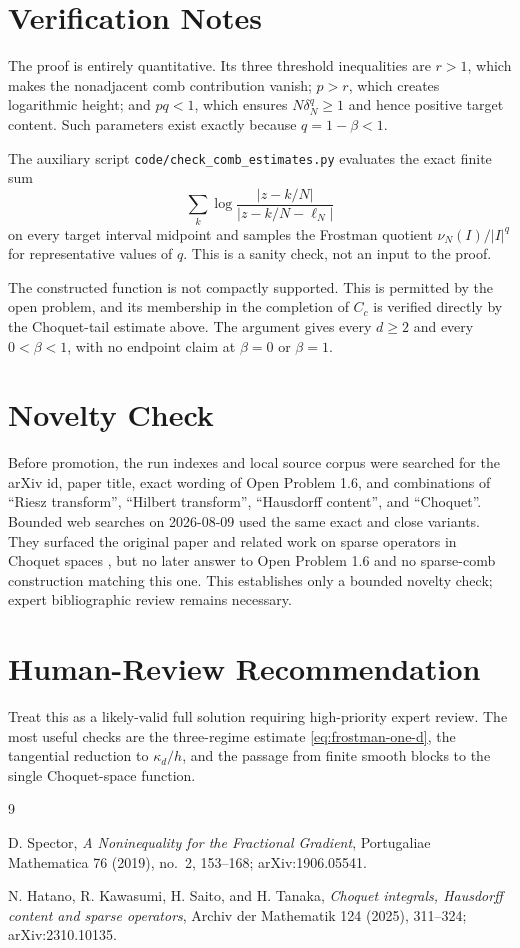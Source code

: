 \documentclass[11pt]{article}
\newcommand{\1}{\mathbf 1}
\begin{document}
\section*{Verification Notes}

The proof is entirely quantitative.  Its three threshold inequalities are
$r>1$, which makes the nonadjacent comb contribution vanish;
$p>r$, which creates logarithmic height; and $pq<1$, which ensures
$N\delta_N^q\geq1$ and hence positive target content.  Such parameters exist
exactly because $q=1-\beta<1$.

The auxiliary script \texttt{code/check\_comb\_estimates.py} evaluates the
exact finite sum
\[
 \sum_k\log\frac{|z-k/N|}{|z-k/N-\ell_N|}
\]
on every target interval midpoint and samples the Frostman quotient
$\nu_N(I)/|I|^q$ for representative values of $q$.  This is a sanity check,
not an input to the proof.

The constructed function is not compactly supported.  This is permitted by
the open problem, and its membership in the completion of $C_c$ is verified
directly by the Choquet-tail estimate above.  The argument gives every
$d\geq2$ and every $0<\beta<1$, with no endpoint claim at $\beta=0$ or
$\beta=1$.

\section*{Novelty Check}

Before promotion, the run indexes and local source corpus were searched for
the arXiv id, paper title, exact wording of Open Problem 1.6, and combinations
of ``Riesz transform'', ``Hilbert transform'', ``Hausdorff content'', and
``Choquet''.  Bounded web searches on 2026-08-09 used the same exact and close
variants.  They surfaced the original paper and related work on sparse
operators in Choquet spaces \cite{HKST}, but no later answer to Open Problem
1.6 and no sparse-comb construction matching this one.  This establishes only
a bounded novelty check; expert bibliographic review remains necessary.

\section*{Human-Review Recommendation}

Treat this as a likely-valid full solution requiring high-priority expert
review.  The most useful checks are the three-regime estimate
\eqref{eq:frostman-one-d}, the tangential reduction to $\kappa_d/h$, and the
passage from finite smooth blocks to the single Choquet-space function.

\begin{thebibliography}{9}

D. Spector,
\emph{A Noninequality for the Fractional Gradient},
Portugaliae Mathematica 76 (2019), no.~2, 153--168;
arXiv:1906.05541.

N. Hatano, R. Kawasumi, H. Saito, and H. Tanaka,
\emph{Choquet integrals, Hausdorff content and sparse operators},
Archiv der Mathematik 124 (2025), 311--324;
arXiv:2310.10135.

\end{thebibliography}
\end{document}
